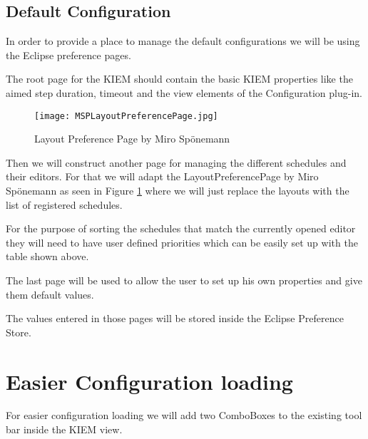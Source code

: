 \subsection{Default Configuration}
\label{section:ConfConceptsDefaultConf}
In order to provide a place to manage the default configurations we will be
using the Eclipse preference pages.

The root page for the \ac{KIEM} should contain the basic KIEM properties like
the aimed step duration, timeout and the view elements of the Configuration
plug-in.

\begin{figure}[MSPLayoutPreferencePage]
  \centering
  \texttt{[image: MSPLayoutPreferencePage.jpg]}
  \caption[Layout Preference Page by Miro Sp\"onemann]%
  {Layout Preference Page by Miro Sp\"onemann\protect\footnotemark}
  \label{fig:MSPLayoutPreferencePage}
\end{figure}

Then we will construct another page for managing the different schedules
and their editors. For that we will adapt the LayoutPreferencePage by Miro Sp\"onemann
as seen in Figure \ref{fig:MSPLayoutPreferencePage} where we will just replace the 
layouts with the list of registered schedules.

For the purpose of sorting the schedules that match the currently opened editor they will
need to have user defined priorities which can be easily set up with the table
shown above.

The last page will be used to allow the user to set up his own properties and give them
default values.

The values entered in those pages will be stored inside the Eclipse Preference
Store.


\section{Easier Configuration loading}
\label{section:ConfConceptsEasyLoading}
For easier configuration loading we will add two ComboBoxes to the existing
tool bar inside the \ac{KIEM} view.

